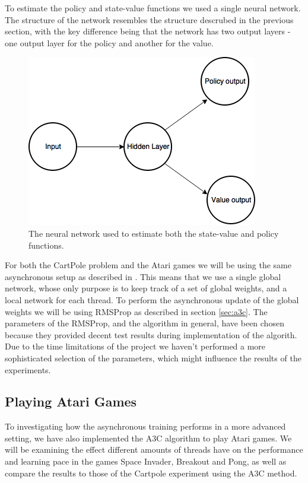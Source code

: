 \documentclass[11pt]{article}
\begin{document}
To estimate the policy and state-value functions we used a single
neural network.
The structure of the network resembles the structure descrubed in the previous section, 
with the key difference being that the network has two output layers -
one output layer for the policy and another for the value.

\begin{figure}[H]
    \centering
    \includegraphics[scale=0.5]{include/shared_cartpole.png}
    \caption{The neural network used to estimate both the state-value
             and policy functions.}
    \label{fig:s_cartpole}
\end{figure}

For both the CartPole problem and the Atari games we will be using the same asynchronous setup
as described in \cite{a3c}.
This means that we use a single global network, whose only
purpose is to keep track of a set of global weights, and a local network
for each thread.
To perform the asynchronous update of the global weights we will be using
RMSProp as described in section \ref{sec:a3c}.
The parameters of the RMSProp, and the algorithm in general, have
been chosen because they provided decent test results during implementation
of the algorith.
Due to the time limitations of the project we haven't performed
a more sophisticated selection of the parameters, which might
influence the results of the experiments.

\subsection{Playing Atari Games}

To investigating how the asynchronous training performs in
a more advanced setting, we have also implemented the A3C algorithm
to play Atari games.
We will be examining the effect different amounts of threads
have on the performance and learning pace in the games Space Invader, Breakout
and Pong, as well as compare the results to those of the Cartpole experiment
using the A3C method.
\end{document}
